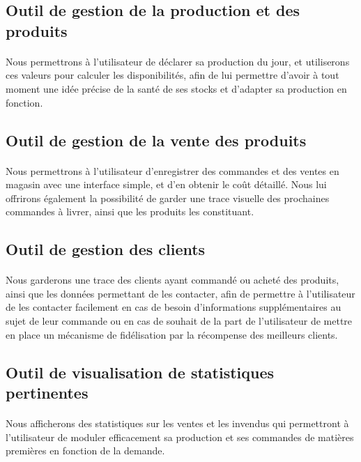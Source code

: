     \subsection{Outil de gestion de la production et des produits}
        \paragraph{}
            Nous permettrons à l'utilisateur de déclarer sa production du jour,
            et utiliserons ces valeurs pour calculer les disponibilités, afin de
            lui permettre d'avoir à tout moment une idée précise de la santé de
            ses stocks et d'adapter sa production en fonction.
    \subsection{Outil de gestion de la vente des produits}
        \paragraph{}
            Nous permettrons à l'utilisateur d'enregistrer des commandes et des
            ventes en magasin avec une interface simple, et d'en obtenir le
            coût détaillé.
            Nous lui offrirons également la possibilité de garder une trace
            visuelle des prochaines commandes à livrer, ainsi que les produits
            les constituant.
    \subsection{Outil de gestion des clients}
        \paragraph{}
            Nous garderons une trace des clients ayant commandé ou acheté des
            produits, ainsi que les données permettant de les contacter,
            afin de permettre à l'utilisateur de les contacter facilement en
            cas de besoin d'informations supplémentaires au sujet de leur
            commande ou en cas de souhait de la part de l'utilisateur de mettre
            en place un mécanisme de fidélisation par la récompense des
            meilleurs clients.
    \subsection{Outil de visualisation de statistiques pertinentes}
        \paragraph{}
            Nous afficherons des statistiques sur les ventes et les invendus qui
            permettront à l'utilisateur de moduler efficacement sa production et
            ses commandes de matières premières en fonction de la demande.
